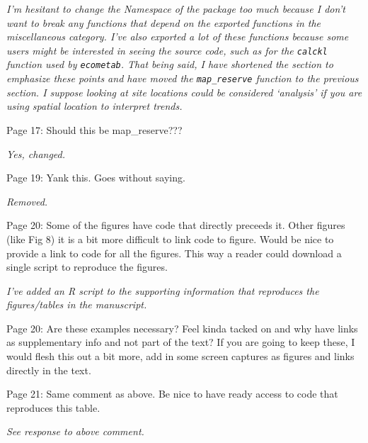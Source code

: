 \documentclass[letterpaper,12pt]{article}\usepackage[]{graphicx}\usepackage[]{color}
\begin{document}
{\it I'm hesitant to change the Namespace of the package too much because I don't want to break any functions that depend on the exported functions in the miscellaneous category.  I've also exported a lot of these functions because some users might be interested in seeing the source code, such as for the \texttt{calckl} function used by \texttt{ecometab}.  That being said, I have shortened the section to emphasize these points and have moved the \texttt{map\_reserve} function to the previous section.  I suppose looking at site locations could be considered `analysis' if you are using spatial location to interpret trends.}

Page 17: Should this be map\_reserve???

{\it Yes, changed.}

Page 19: Yank this. Goes without saying.

{\it Removed.}

Page 20: Some of the figures have code that directly preceeds it. Other figures (like Fig 8) it is a bit more difficult to link code to figure. Would be nice to provide a link to code for all the figures. This way a reader could download a single script to reproduce the figures.

{\it I've added an R script to the supporting information that reproduces the figures/tables in the manuscript.}

Page 20: Are these examples necessary? Feel kinda tacked on and why have links as supplementary info and not part of the text? If you are going to keep these, I would flesh this out a bit more, add in some screen captures as figures and links directly in the text.

{\it }

Page 21: Same comment as above. Be nice to have ready access to code that reproduces this table.

{\it See response to above comment.}
\end{document}
